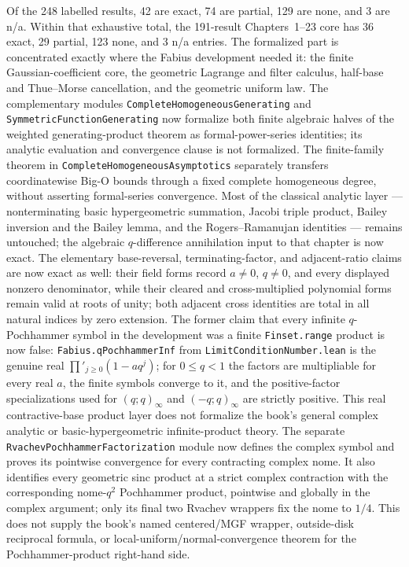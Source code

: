 \documentclass[11pt,a4paper,oneside,openany]{book}
\theoremstyle{definition}
\theoremstyle{remark}
\newcommand{\statusexact}{\textsf{\color{statusgreen}exact}}
\newcommand{\statuspartial}{\textsf{\color{statusamber}partial}}
\newcommand{\statusnone}{\textsf{\color{statusred}none}}
\newcommand{\statusna}{\textsf{n/a}}
\begin{document}
Of the 248 labelled results, 42 are \statusexact, 74 are \statuspartial,
129 are \statusnone, and 3 are \statusna.
Within that exhaustive total, the 191-result Chapters~1--23 core has 36
\statusexact, 29 \statuspartial, 123 \statusnone, and 3 \statusna{} entries.
The formalized part is concentrated exactly where the Fabius development
needed it: the finite Gaussian-coefficient core, the geometric Lagrange and
filter calculus, half-base and Thue--Morse cancellation, and the geometric
uniform law.  The complementary modules
\texttt{CompleteHomogeneousGenerating} and
\texttt{SymmetricFunctionGenerating} now formalize both finite algebraic
halves of the weighted generating-product theorem as formal-power-series
identities; its analytic evaluation and convergence clause is not
formalized.  The finite-family theorem in
\texttt{CompleteHomogeneousAsymptotics} separately transfers coordinatewise
Big-O bounds through a fixed complete homogeneous degree, without asserting
formal-series convergence.  Most of the classical analytic layer --- nonterminating basic
hypergeometric summation, Jacobi triple product, Bailey inversion and the
Bailey lemma, and the Rogers--Ramanujan identities --- remains untouched;
the algebraic \(q\)-difference annihilation input to that chapter is now
exact.  The elementary base-reversal, terminating-factor, and adjacent-ratio
claims are now exact as well: their field forms record \(a\ne0\), \(q\ne0\),
and every displayed nonzero denominator, while their cleared and
cross-multiplied polynomial forms remain valid at roots of unity; both
adjacent cross identities are total in all natural indices by zero extension.
The former
claim that every infinite \(q\)-Pochhammer symbol in
the development was a finite \texttt{Finset.range} product is now false:
\texttt{Fabius.qPochhammerInf} from \texttt{LimitConditionNumber.lean} is the genuine real
\(\prod'_{j\ge0}(1-aq^j)\); for \(0\le q<1\) the factors are multipliable for
every real \(a\), the finite symbols converge to it, and the positive-factor
specializations used for \((q;q)_\infty\) and \((-q;q)_\infty\) are strictly
positive.  This real contractive-base product layer does not formalize the
book's general complex analytic or basic-hypergeometric infinite-product
theory.  The separate \texttt{RvachevPochhammerFactorization} module now
defines the complex symbol and proves its pointwise convergence for every
contracting complex nome.  It also identifies every geometric sinc product
at a strict complex contraction with the corresponding nome-\(q^2\)
Pochhammer product, pointwise and globally in the complex argument; only its
final two Rvachev wrappers fix the nome to \(1/4\).  This does not supply the
book's named centered/MGF wrapper, outside-disk reciprocal formula, or
local-uniform/normal-convergence theorem for the Pochhammer-product
right-hand side.
\end{document}
